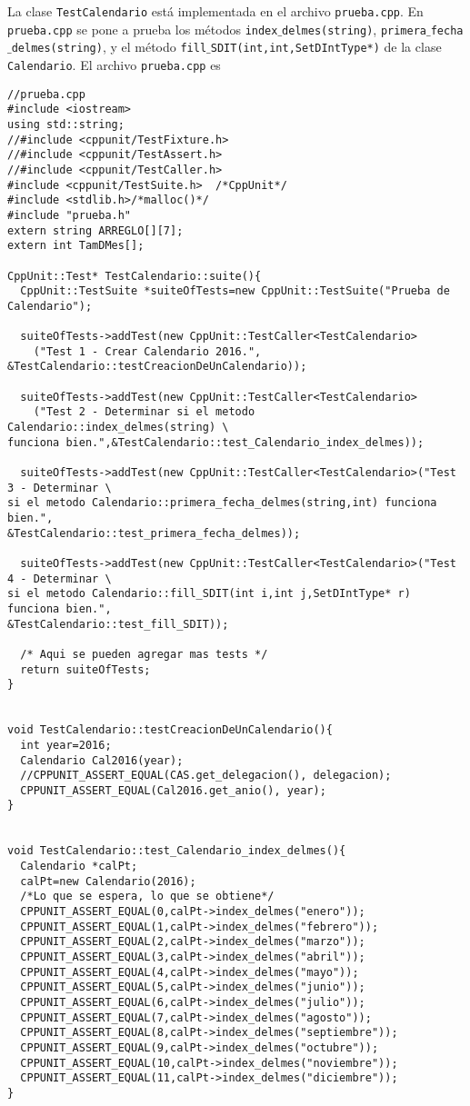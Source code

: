 \documentclass{article}
\begin{document}
La clase {\tt TestCalendario} est\'a implementada en el archivo 
{\tt prueba.cpp}. En {\tt prueba.cpp} se pone a prueba los m\'etodos 
{\tt index$\_$delmes(string)}, {\tt primera$\_$fecha$\_$delmes(string)}, 
y el m\'etodo {\tt fill$\_$SDIT(int,int,SetDIntType*)} de la clase 
{\tt Calendario}. El archivo {\tt prueba.cpp} es
\begin{verbatim}
//prueba.cpp
#include <iostream>
using std::string;
//#include <cppunit/TestFixture.h>
//#include <cppunit/TestAssert.h>
//#include <cppunit/TestCaller.h>
#include <cppunit/TestSuite.h>  /*CppUnit*/
#include <stdlib.h>/*malloc()*/
#include "prueba.h"
extern string ARREGLO[][7];
extern int TamDMes[];

CppUnit::Test* TestCalendario::suite(){
  CppUnit::TestSuite *suiteOfTests=new CppUnit::TestSuite("Prueba de Calendario");

  suiteOfTests->addTest(new CppUnit::TestCaller<TestCalendario>
    ("Test 1 - Crear Calendario 2016.", &TestCalendario::testCreacionDeUnCalendario));

  suiteOfTests->addTest(new CppUnit::TestCaller<TestCalendario>
    ("Test 2 - Determinar si el metodo Calendario::index_delmes(string) \
funciona bien.",&TestCalendario::test_Calendario_index_delmes));

  suiteOfTests->addTest(new CppUnit::TestCaller<TestCalendario>("Test 3 - Determinar \
si el metodo Calendario::primera_fecha_delmes(string,int) funciona bien.",
&TestCalendario::test_primera_fecha_delmes));

  suiteOfTests->addTest(new CppUnit::TestCaller<TestCalendario>("Test 4 - Determinar \
si el metodo Calendario::fill_SDIT(int i,int j,SetDIntType* r) funciona bien.",
&TestCalendario::test_fill_SDIT));

  /* Aqui se pueden agregar mas tests */
  return suiteOfTests;
}


void TestCalendario::testCreacionDeUnCalendario(){
  int year=2016;
  Calendario Cal2016(year);
  //CPPUNIT_ASSERT_EQUAL(CAS.get_delegacion(), delegacion);
  CPPUNIT_ASSERT_EQUAL(Cal2016.get_anio(), year);
}


void TestCalendario::test_Calendario_index_delmes(){
  Calendario *calPt;
  calPt=new Calendario(2016);
  /*Lo que se espera, lo que se obtiene*/
  CPPUNIT_ASSERT_EQUAL(0,calPt->index_delmes("enero"));
  CPPUNIT_ASSERT_EQUAL(1,calPt->index_delmes("febrero"));
  CPPUNIT_ASSERT_EQUAL(2,calPt->index_delmes("marzo"));
  CPPUNIT_ASSERT_EQUAL(3,calPt->index_delmes("abril"));
  CPPUNIT_ASSERT_EQUAL(4,calPt->index_delmes("mayo"));
  CPPUNIT_ASSERT_EQUAL(5,calPt->index_delmes("junio"));
  CPPUNIT_ASSERT_EQUAL(6,calPt->index_delmes("julio"));
  CPPUNIT_ASSERT_EQUAL(7,calPt->index_delmes("agosto"));
  CPPUNIT_ASSERT_EQUAL(8,calPt->index_delmes("septiembre"));
  CPPUNIT_ASSERT_EQUAL(9,calPt->index_delmes("octubre"));
  CPPUNIT_ASSERT_EQUAL(10,calPt->index_delmes("noviembre"));
  CPPUNIT_ASSERT_EQUAL(11,calPt->index_delmes("diciembre"));
}


\end{verbatim}
\end{document}
